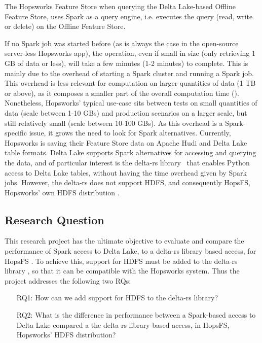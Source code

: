 The Hopsworks Feature Store \cite{HopsworksBatchRealtime2024} when querying the Delta Lake-based Offline Feature Store, uses Spark as a query engine, i.e. executes the query (read, write or delete) on the Offline Feature Store.

If no Spark job was started before (as is always the case in the open-source server-less Hopsworks app), the operation, even if small in size (only retrieving 1 GB of data or less), will take a few minutes (1-2 minutes) to complete. This is mainly due to the overhead of starting a Spark cluster and running a Spark job.
This overhead is less relevant for computation on larger quantities of data (1 TB or above), as it composes a smaller part of the overall computation time (). %
Nonetheless, Hopsworks' typical use-case sits between tests on small quantities of data (scale between 1-10 GBs) and production scenarios on a larger scale, but still relatively small (scale between 10-100 GBs).
As this overhead is a Spark-specific issue, it grows the need to look for Spark alternatives. Currently, Hopsworks is saving their Feature Store data on Apache Hudi and Delta Lake table formats. Delta Lake supports Spark alternatives for accessing and querying the data, and of particular interest is the delta-rs library~\cite{DeltaioDeltars2024} that enables Python access to Delta Lake tables, without having the time overhead given by Spark jobs. 
However, the delta-rs \cite{DeltaioDeltars2024} does not support \gls{HDFS}, and consequently HopsFS, Hopsworks' own \gls{HDFS} distribution \cite{niaziHopsFSScalingHierarchical2017}.

\subsection{Research Question}
\label{sec:researchQuestion}
This research project has the ultimate objective to evaluate and compare the performance of Spark access to Delta Lake, to a delta-rs library \cite{DeltaioDeltars2024} based access, for HopsFS \cite{niaziHopsFSScalingHierarchical2017}. To achieve this, support for \gls{HDFS} must be added to the delta-rs library \cite{DeltaioDeltars2024}, so that it can be compatible with the Hopsworks system. Thus the project addresses the following two \glspl{RQ}:
\begin{enumerate}
    \item[RQ1:] How can we add support for \gls{HDFS} to the delta-rs library?
    \item[RQ2:] What is the difference in performance between a Spark-based access to Delta Lake compared a the delta-rs library-based access, in HopsFS, Hopsworks' \gls{HDFS} distribution?  
\end{enumerate}

